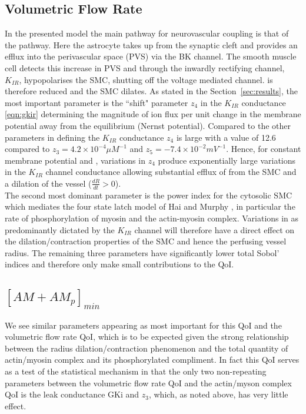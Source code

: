 \subsection{Volumetric Flow Rate}
In the presented model the main pathway for neurovascular coupling is that of the \pot pathway. Here the astrocyte takes up \pot from the synaptic cleft and provides an efflux into the perivascular space (PVS) via the BK channel. The smooth muscle cell detects this increase in PVS \pot and through the inwardly rectifying channel, $K_{IR}$, hypopolarises the SMC, shutting off the voltage mediated \ca channel.  \ca is therefore reduced and the SMC dilates. As stated in the Section~\ref{sec:results}, the most important parameter is the ``shift" parameter $z_4$ in the $K_{IR}$ conductance \eqref{eqn:gkir} determining the magnitude of ion flux per unit change in the membrane potential away from the equilibrium (Nernst potential).  Compared to the other parameters in defining the $K_{IR}$ conductance $z_4$ is large with a value of 12.6 compared to $z_3=4.2 \times 10^{-4} \mu M^{-1}$ and $z_5 = -7.4 \times10^{-2} mV^{-1}$. Hence, for constant membrane potential and \pot,   variations in $z_4$ produce exponentially large variations in the $K_{IR}$ channel conductance allowing substantial efflux of \ca from the SMC and a dilation of the vessel ($\frac{dR}{dt}> 0$). \\

The second most dominant parameter is the power index for the cytosolic SMC \ca which mediates the four state latch model of Hai and Murphy \cite{Hai1988}, in particular the rate of phosphorylation of  myosin and the actin-myosin complex.  Variations in \ca as predominantly dictated by the $K_{IR}$ channel will therefore have a direct effect on the dilation/contraction properties of the SMC and hence the perfusing vessel radius.  
The remaining three parameters have significantly lower total Sobol' indices and therefore only make small contributions to the QoI.
 
\subsection{$[AM+AM_p]_{min}$}
We see similar parameters appearing as most important for this QoI and the volumetric flow rate QoI, which is to be expected given the strong relationship between the radius dilation/contraction phenomenon and the total quantity of actin/myosin complex and its phosphorylated compliment. In fact this QoI serves as a test of the statistical mechanism in that the only two non-repeating parameters between the volumetric flow rate QoI and the actin/myson complex QoI is the leak conductance GKi and $z_3$, which, as noted above, has very little effect. 
